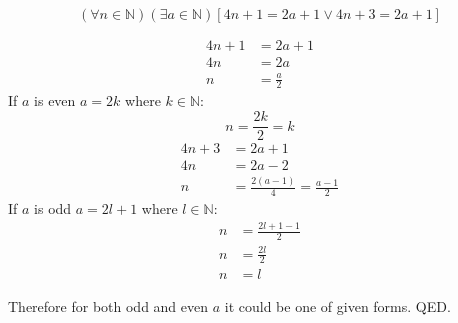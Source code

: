 \documentclass{article}
\begin{document}
$$(\forall n \in \mathbb{N})(\exists a \in \mathbb{N})[4n+1=2a+1 \vee 4n+3=2a+1]$$
\newline
\begin{multicols}{2}
\noindent
\begin{align*}
4n+1&=2a+1\\
4n&=2a\\
n&=\frac{a}{2}
\end{align*}
\newline
If $a$ is even $a=2k$ where $k \in \mathbb{N}$:
$$n=\frac{2k}{2}=k$$
\columnbreak
\begin{align*}
4n+3&=2a+1\\
4n&=2a-2\\
n&=\frac{2(a-1)}{4}=\frac{a-1}{2}
\end{align*}
\newline
If $a$ is odd $a=2l+1$ where $l \in \mathbb{N}$:
\newline
\begin{align*}
n&=\frac{2l+1-1}{2}\\
n&=\frac{2l}{2}\\
n&=l
\end{align*}
\end{multicols}
\begin{flushleft}
Therefore for both odd and even $a$ it could be one of given forms.
\newline
QED.
\end{flushleft}
\end{document}
